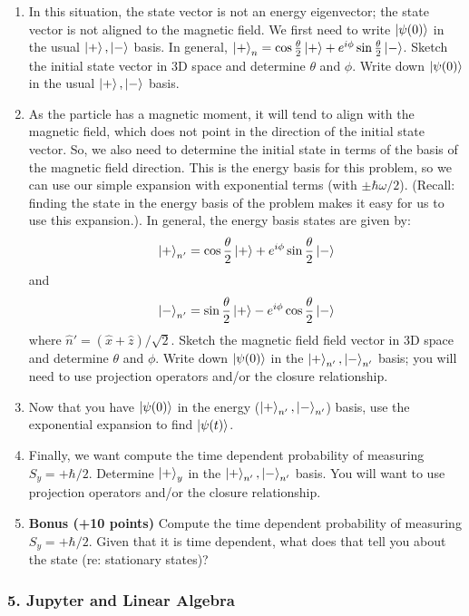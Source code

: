\documentclass[
]{article}
\providecommand{\tightlist}{%
  \setlength{\itemsep}{0pt}\setlength{\parskip}{0pt}}
\providecommand{\tightlist}{%
  \setlength{\itemsep}{0pt}\setlength{\parskip}{0pt}}
\begin{document}
\begin{enumerate}
\def\labelenumi{\arabic{enumi}.}
\tightlist
\item
  In this situation, the state vector is not an energy eigenvector; the
  state vector is not aligned to the magnetic field. We first need to
  write \(\ket{\psi(0)}\) in the usual \(\ket{+}, \ket{-}\) basis. In
  general,
  \(\ket{+}_n = \cos\frac{\theta}{2}\ket{+} + e^{i\phi}\sin\frac{\theta}{2}\ket{-}\).
  Sketch the initial state vector in 3D space and determine \(\theta\)
  and \(\phi\). Write down \(\ket{\psi(0)}\) in the usual
  \(\ket{+}, \ket{-}\) basis.
\item
  As the particle has a magnetic moment, it will tend to align with the
  magnetic field, which does not point in the direction of the initial
  state vector. So, we also need to determine the initial state in terms
  of the basis of the magnetic field direction. This is the energy basis
  for this problem, so we can use our simple expansion with exponential
  terms (with \(\pm \hbar \omega/2\)). (Recall: finding the state in the
  energy basis of the problem makes it easy for us to use this
  expansion.). In general, the energy basis states are given by:
  \[\ket{+}_{n'} = \cos\frac{\theta}{2}\ket{+} + e^{i\phi}\sin\frac{\theta}{2}\ket{-}\]
  and
  \[\ket{-}_{n'} = \sin\frac{\theta}{2}\ket{+} - e^{i\phi}\cos\frac{\theta}{2}\ket{-}\]
  where \(\hat{n}' = (\hat{x}+\hat{z})/\sqrt{2}\). Sketch the magnetic
  field field vector in 3D space and determine \(\theta\) and \(\phi\).
  Write down \(\ket{\psi(0)}\) in the \(\ket{+}_{n'}, \ket{-}_{n'}\)
  basis; you will need to use projection operators and/or the closure
  relationship.
\item
  Now that you have \(\ket{\psi(0)}\) in the energy
  (\(\ket{+}_{n'}, \ket{-}_{n'}\)) basis, use the exponential expansion
  to find \(\ket{\psi(t)}\).
\item
  Finally, we want compute the time dependent probability of measuring
  \(S_y = +\hbar/2\). Determine \(\ket{+}_y\) in the
  \(\ket{+}_{n'}, \ket{-}_{n'}\) basis. You will want to use projection
  operators and/or the closure relationship.
\item
  \textbf{Bonus (+10 points)} Compute the time dependent probability of
  measuring \(S_y = +\hbar/2\). Given that it is time dependent, what
  does that tell you about the state (re: stationary states)?
\end{enumerate}

\hypertarget{jupyter-and-linear-algebra}{%
\subsubsection{5. Jupyter and Linear
Algebra}\label{jupyter-and-linear-algebra}}
\end{document}
